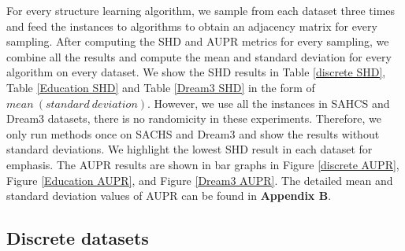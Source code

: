 \documentclass[twoside,11pt]{article}
\begin{document}
For every structure learning algorithm, we sample from each dataset three times and feed the instances to algorithms to obtain an adjacency matrix for every sampling. After computing the SHD and AUPR metrics for every sampling, we combine all the results and compute the mean and standard deviation for every algorithm on every dataset. We show the SHD results in Table \ref{discrete SHD}, Table \ref{Education SHD} and Table \ref{Dream3 SHD} in the form of $mean\ (standard\  deviation)$. However, we use all the instances in SAHCS and Dream3 datasets, there is no randomicity in these experiments. Therefore, we only run methods once on SACHS and Dream3 and show the results without standard deviations. We highlight the lowest SHD result in each dataset for emphasis. The AUPR results are shown in bar graphs in Figure \ref{discrete AUPR}, Figure \ref{Education AUPR}, and Figure \ref{Dream3 AUPR}. The detailed mean and standard deviation values of AUPR can be found in \textbf{Appendix B}.






\subsection{Discrete datasets}

\begin{table*}[htpb]
\centering
\fontsize{10}{22}\selectfont
\caption{SHD on discrete datasets}\label{discrete SHD}
\end{table*}
\end{document}
